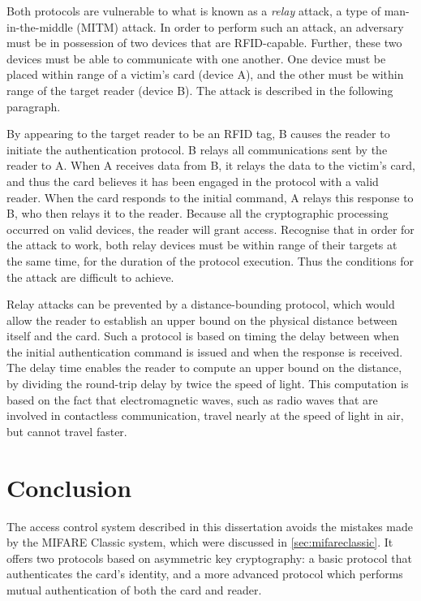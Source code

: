 \documentclass[12pt,a4paper,twoside,openright]{report}
\begin{document}
Both protocols are vulnerable to what is known as a \emph{relay} attack, a type of man-in-the-middle (MITM) attack. In order to perform such an attack, an adversary must be in possession of two devices that are RFID-capable. Further, these two devices must be able to communicate with one another. One device must be placed within range of a victim's card (device A), and the other must be within range of the target reader (device B). The attack is described in the following paragraph.

By appearing to the target reader to be an RFID tag, B causes the reader to initiate the authentication protocol. B relays all communications sent by the reader to A. When A receives data from B, it relays the data to the victim's card, and thus the card believes it has been engaged in the protocol with a valid reader. When the card responds to the initial command, A relays this response to B, who then relays it to the reader. Because all the cryptographic processing occurred on valid devices, the reader will grant access. Recognise that in order for the attack to work, both relay devices must be within range of their targets at the same time, for the duration of the protocol execution. Thus the conditions for the attack are difficult to achieve.

Relay attacks can be prevented by a distance-bounding protocol, which would allow the reader to establish an upper bound on the physical distance between itself and the card. Such a protocol is based on timing the delay between when the initial authentication command is issued and when the response is received. The delay time enables the reader to compute an upper bound on the distance, by dividing the round-trip delay by twice the speed of light. This computation is based on the fact that electromagnetic waves, such as radio waves that are involved in contactless communication, travel nearly at the speed of light in air, but cannot travel faster. 

\chapter{Conclusion}

The access control system described in this dissertation avoids the mistakes made by the MIFARE Classic system, which were discussed in \autoref{sec:mifareclassic}. It offers two protocols based on asymmetric key cryptography: a basic protocol that authenticates the card's identity, and a more advanced protocol which performs mutual authentication of both the card and reader.
\end{document}
